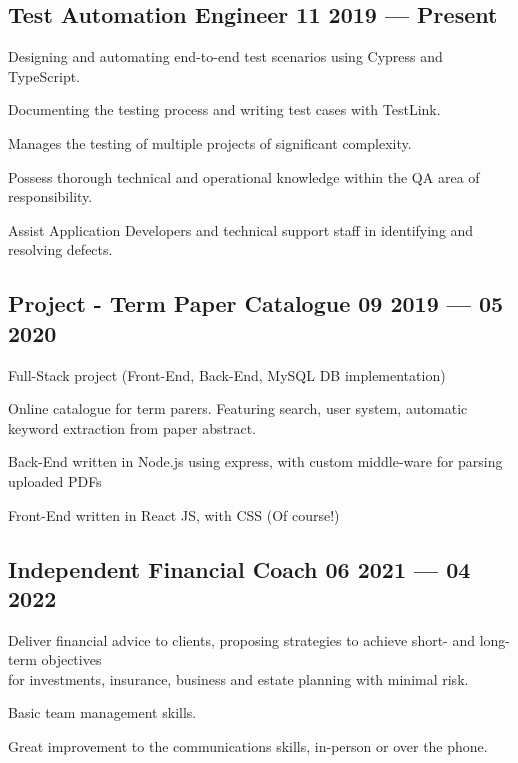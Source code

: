 \documentclass[letter,10pt]{article}
\begin{document}
\subsection{{Test Automation Engineer \hfill 11 2019 --- Present}}
\begin{zitemize}
\item Designing and automating end-to-end test scenarios using Cypress and TypeScript.
\item Documenting the testing process and writing test cases with TestLink.
\item Manages the testing of multiple projects of significant complexity.
\item Possess thorough technical and operational knowledge within the QA area of responsibility.
\item Assist Application Developers and technical support staff in identifying and resolving defects.
\end{zitemize}

\subsection{{Project - Term Paper Catalogue \hfill 09 2019 --- 05 2020}}
\begin{zitemize}
\item Full-Stack project (Front-End, Back-End, MySQL DB implementation)
\item Online catalogue for term parers. Featuring search, user system, automatic keyword extraction from paper abstract.
\item Back-End written in Node.js using express, with custom middle-ware for parsing uploaded PDFs
\item Front-End written in React JS, with CSS (Of course!)
\end{zitemize}

\subsection{{Independent Financial Coach \hfill 06 2021 --- 04 2022}}
\begin{zitemize}
\item Deliver financial advice to clients, proposing strategies to achieve short- and long-term objectives\\ for investments, insurance, business and estate planning with minimal risk.
\item Basic team management skills.
\item Great improvement to the communications skills, in-person or over the phone.
\end{zitemize}
\end{document}
